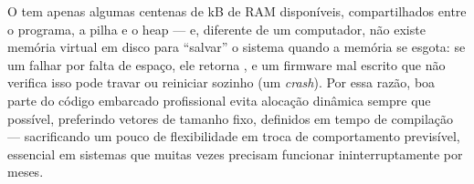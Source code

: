 \begin{esp32box}
O \ESP{} tem apenas algumas centenas de kB de RAM disponíveis, compartilhados entre o programa, a pilha e o heap — e, diferente de um computador, não existe memória virtual em disco para ``salvar'' o sistema quando a memória se esgota: se um  falhar por falta de espaço, ele retorna , e um firmware mal escrito que não verifica isso pode travar ou reiniciar sozinho (um \emph{crash}). Por essa razão, boa parte do código embarcado profissional evita alocação dinâmica sempre que possível, preferindo vetores de tamanho fixo, definidos em tempo de compilação — sacrificando um pouco de flexibilidade em troca de comportamento previsível, essencial em sistemas que muitas vezes precisam funcionar ininterruptamente por meses.
\end{esp32box}
